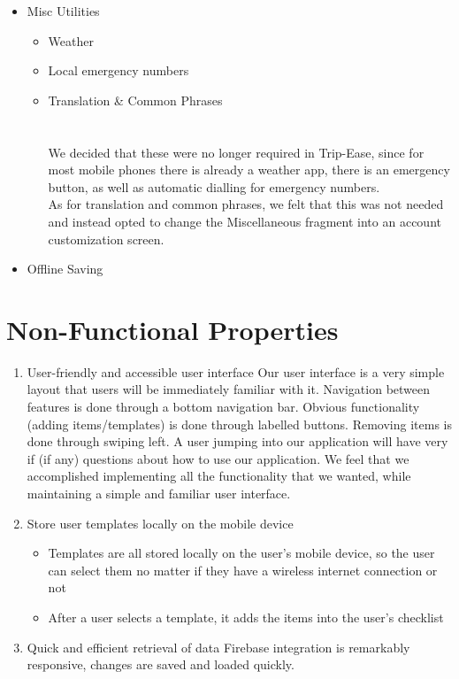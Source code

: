 \documentclass[12pt]{article}
\begin{document}
\begin{itemize}
		\item{Misc Utilities}

		\begin{itemize}
			\item Weather
			\item Local emergency numbers
			\item Translation \& Common Phrases
			\\
			\\
			\\
			We decided that these were no longer required in Trip-Ease, since for most mobile phones there is already a weather app, there is an emergency button, as well as automatic dialling for emergency numbers.\\
			As for translation and common phrases, we felt that this was not needed and instead opted to change the Miscellaneous fragment into an account customization screen.
		\end{itemize}

		\item{Offline Saving}

	\end{itemize}

	\section*{Non-Functional Properties}


	\begin{enumerate}
		\item{User-friendly and accessible user interface}
		Our user interface is a very simple layout that users will be immediately familiar with it. Navigation between features is done through a bottom navigation bar.
		Obvious functionality (adding items/templates) is done through labelled buttons. Removing items is done through swiping left.
		A user jumping into our application will have very if (if any) questions about how to use our application.
		We feel that we accomplished implementing all the functionality that we wanted, while maintaining a simple and familiar user interface.

		\item{Store user templates locally on the mobile device}
		\begin{itemize}
			\item Templates are all stored locally on the user's mobile device, so the user can select them no matter if they have a wireless internet connection or not
			\item After a user selects a template, it adds the items into the user's checklist
		\end{itemize}

		\item{Quick and efficient retrieval of data}
			Firebase integration is remarkably responsive, changes are saved and loaded quickly.
	\end{enumerate}

	\pagebreak
\end{document}
